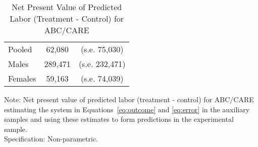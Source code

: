 \begin{table}[H] 
\begin{threeparttable}
\caption{Net Present Value of Predicted Labor (Treatment - Control) for ABC/CARE}
\label{table:yourlabel}
\centering 
\begin{tabular}{lcc} \toprule
Pooled & 62,080 & (s.e. 75,030) \\
Males & 289,471 & (s.e. 232,471) \\ 
Females & 59,163 & (s.e. 74,039) \\ \bottomrule
\end{tabular}
\end{threeparttable}
\end{table}
\begin{spacing}{1}
\begin{footnotesize}
\noindent Note: Net present value of predicted labor (treatment - control) for ABC/CARE estimating the system in Equations~\eqref{eq:outcome} and \eqref{eq:error} in the auxiliary samples and using these estimates to form predictions in the experimental sample.\\ 
\noindent Specification: Non-parametric. 
\end{footnotesize}
\end{spacing}






\singlespace






